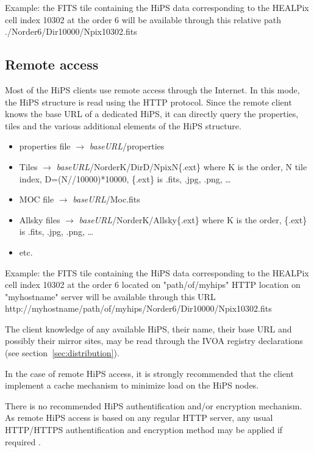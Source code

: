 \documentclass[11pt,a4paper]{ivoa}
\begin{document}
Example: the FITS tile containing the HiPS data corresponding to the HEALPix cell index 10302 at the order 6 will be available through this relative path ./Norder6/Dir10000/Npix10302.fits


\subsection{Remote access}

Most of the HiPS clients use remote access through the Internet. In this mode, the HiPS structure is read using the HTTP protocol.  Since the remote client knows the base URL of a dedicated HiPS, it can directly query the properties, tiles and the various additional elements of the HiPS structure.

\begin{itemize}
\item properties file $\rightarrow$ {\em baseURL}/properties
\item Tiles $\rightarrow$ {\em baseURL}/NorderK/DirD/NpixN\{.ext\}
where K  is the order, N tile index, D=(N//10000)*10000,
\{.ext\} is .fits, .jpg, .png, …
\item MOC file $\rightarrow$ {\em baseURL}/Moc.fits
\item Allsky files $\rightarrow$ {\em baseURL}/NorderK/Allsky\{.ext\}
where K is the order, \{.ext\} is .fits, .jpg, .png, …
\item etc.
\end{itemize}

Example: the FITS tile containing the HiPS data corresponding to the HEALPix cell index 10302 at the order 6 located on "path/of/myhips" HTTP location on "myhostname" server will be available through this URL \\ http://myhostname/path/of/myhips/Norder6/Dir10000/Npix10302.fits

The client knowledge of any available HiPS, their name, their base URL and possibly their mirror sites, may be read through the IVOA registry declarations (see section~\ref{sec:distribution}). 

In the case of remote HiPS access, it is strongly recommended that the client implement a cache mechanism to minimize load on the HiPS nodes.

There is no recommended HiPS authentification and/or encryption mechanism. As remote HiPS access is based on any regular HTTP server, any usual HTTP/HTTPS authentification and encryption method may be applied if required \citep{SSO2008}.
\end{document}
